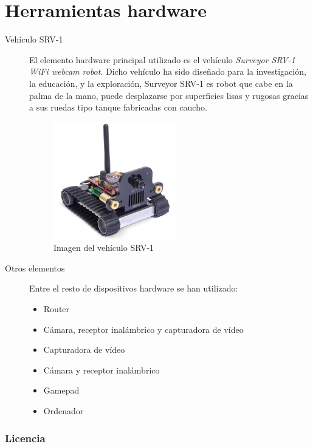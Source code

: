 \documentclass[a4paper,12pt]{article}
\begin{document}
\section{Herramientas hardware}
\begin{description}
\item [Vehículo SRV-1]

El elemento hardware principal utilizado es el vehículo \emph{Surveyor SRV-1 WiFi webcam robot}. Dicho vehículo ha sido diseñado para la investigación, la educación, y la exploración, Surveyor SRV-1 es robot que cabe en la palma de la mano, puede desplazarse por superficies lisas y rugosas gracias a sus ruedas tipo tanque fabricadas con caucho. \\

\begin{figure}[H]
  \begin{center}
    \includegraphics[scale=1]{imagenes/srv-1.png}
  \end{center}
  \caption{Imagen del vehículo SRV-1}
  \label{SRV-1}
\end{figure}

\item [Otros elementos]

Entre el resto de dispositivos hardware se han utilizado:

\begin{itemize}
\item Router
\item Cámara, receptor inalámbrico y capturadora de vídeo
\item Capturadora de vídeo
\item Cámara y receptor inalámbrico
\item Gamepad
\item Ordenador
\end{itemize}

\end{description}

\subsubsection{Licencia}
\end{document}
